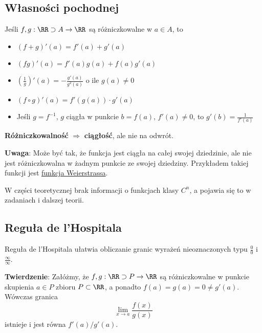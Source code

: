 \subsection{Własności pochodnej}
Jeśli $f, g: \RR \supset A \to \RR$ są różniczkowalne w $a \in A$, to
\begin{itemize}
    \item $(f+g)'(a) = f'(a) + g'(a)$
    \item $(fg)'(a)=f'(a)g(a) + f(a)g'(a)$
    \item $\left(\frac{1}{g}\right)'(a)=-\frac{g'(a)}{g^2(a)}$ o ile $g(a)\neq 0$
    \item $(f \circ g )'(a) = f'(g(a))\cdot g'(a)$
    \item Jeśli $g=f^{-1}$, $g$ ciągła w punkcie $b=f(a)$, $f'(a)\neq 0$, to $g'(b)=\frac{1}{f'(a)}$
\end{itemize}

\textbf{Różniczkowalność} $\Longrightarrow$ \textbf{ciągłość}, ale nie na odwrót.

\textbf{Uwaga}:
Może być tak, że funkcja jest ciągła na całej swojej dziedzinie, ale nie jest różniczkowalna w żadnym punkcie ze swojej dziedziny. Przykładem takiej funkcji jest \href{https://pl.wikipedia.org/wiki/Funkcja_Weierstrassa}{funkcja Weierstrassa}.

\begin{editorsnote}
    W części teoretycznej brak informacji o funkcjach klasy $C^n$, a pojawia się to w zadaniach i dalszej teorii.
\end{editorsnote}

\subsection{Reguła de l'Hospitala}
Reguła de l'Hospitala ułatwia obliczanie granic wyrażeń nieoznaczonych typu $\frac{0}{0}$ i $\frac{\infty}{\infty}$.

\textbf{Twierdzenie}: Załóżmy, że $f,g:\RR\supset P\to\RR$ są różniczkowalne w punkcie skupienia $a\in P$ zbioru $P\subset\RR$, a ponadto $f(a)=g(a)=0\neq g'(a)$. Wówczas granica
$$\lim_{x\to a}\frac{f(x)}{g(x)}$$
istnieje i jest równa $f'(a)/g'(a)$.

